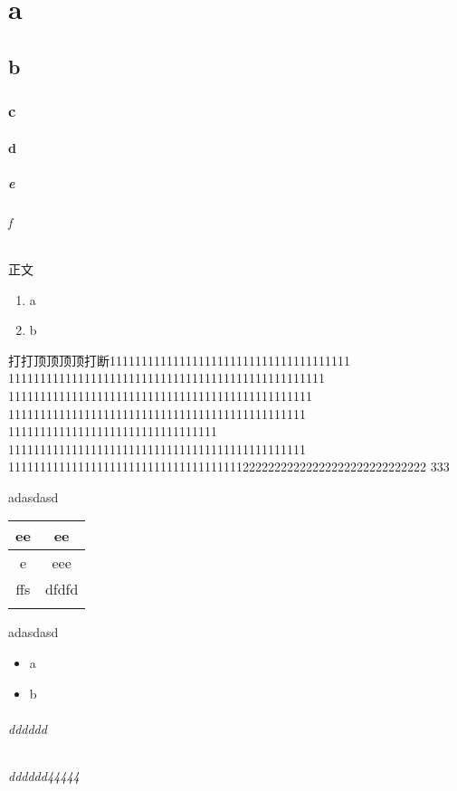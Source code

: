 \documentclass{ctexbook}
\begin{document}
\tableofcontents
\part{a}
\chapter{b}
\section{c}
\subsection{d}
\subsubsection{e}
\paragraph{f}
正文

\begin{enumerate}
\item a
\item b
\end{enumerate}
打打顶顶顶顶打断11111111111111111111111111111111111111
11111111111111111111111111111111111111111111111111
111111111111111111111111111111111111111111111111
11111111111111111111111111111111111111111111111
111111111111111111111111111111111
11111111111111111111111111111111111111111111111
111111111111111111111111111111111111122222222222222222222222222222
333

adasdasd

\begin{tabular}{|c|c|}
	\hline 
	ee & ee \\ 
	\hline 
	e & eee \\ 
	ffs & dfdfd \\
	\hline 
 & \\
\end{tabular} 
adasdasd
\begin{itemize}
\item a
\item b
\end{itemize}
\paragraph{dddddd}
\paragraph*{dddddd44444}
\end{document}

